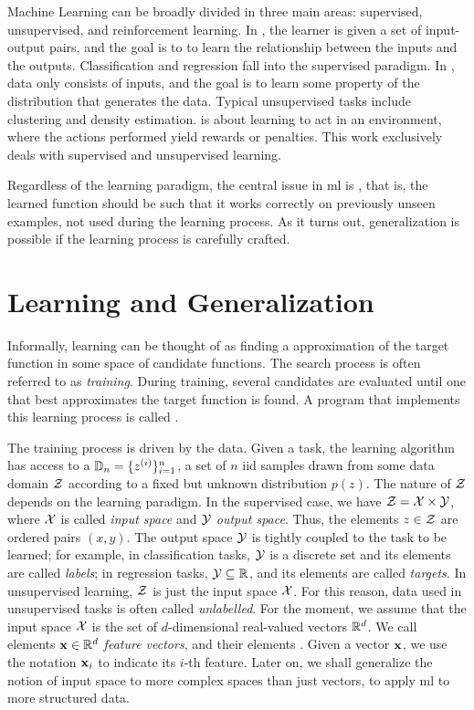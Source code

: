 Machine Learning can be broadly divided in three main areas: supervised, unsupervised, and reinforcement learning. In , the learner is given a set of input-output pairs, and the goal is to to learn the relationship between the inputs and the outputs. Classification and regression fall into the supervised paradigm. In , data only consists of inputs, and the goal is to learn some property of the distribution that generates the data. Typical unsupervised tasks include clustering and density estimation.  \citep{sutton1998rl} is about learning to act in an environment, where the actions performed yield rewards or penalties. This work exclusively deals with supervised and unsupervised learning.

Regardless of the learning paradigm, the central issue in \gls{ml} is , that is, the learned function should be such that it works correctly on previously unseen examples, not used during the learning process. As it turns out, generalization is possible if the learning process is carefully crafted.

\section{Learning and Generalization}\label{sec:learning}
Informally, learning can be thought of as finding a  approximation of the target function in some space of candidate functions. The search process is often referred to as \emph{training}. During training, several candidates are evaluated until one that best approximates the target function is found. A program that implements this learning process is called .

The training process is driven by the data. Given a task, the learning algorithm has access to a  $\mathbb{D}_n = \{ z^{(i)} \}_{i=1}^n$, a set of $n$ \gls{iid} samples drawn from some data domain $\Cal{Z}$ according to a fixed but unknown distribution $p(z)$. The nature of $\Cal{Z}$ depends on the learning paradigm. In the supervised case, we have $\Cal{Z} = \Cal{X} \times \Cal{Y}$, where $\Cal{X}$ is called \emph{input space} and $\Cal{Y}$ \emph{output space}. Thus, the elements $z \in \Cal{z}$ are ordered pairs $(x, y)$. The output space $\Cal{Y}$ is tightly coupled to the task to be learned; for example, in classification tasks, $\Cal{Y}$ is a discrete set and its elements are called \emph{labels}; in regression tasks, $\Cal{Y} \subseteq \Real$, and its elements are called \emph{targets}. In unsupervised learning, $\Cal{Z}$ is just the input space $\Cal{X}$. For this reason, data used in unsupervised tasks is often called \emph{unlabelled}. For the moment, we assume that the input space $\Cal{X}$ is the set of $d$-dimensional real-valued vectors $\mathbb{R}^d$. We call elements $\Vector{x} \in \Real^d$  \emph{feature vectors}, and their elements . Given a vector $\Vector{x}$, we use the notation $\Vector{x}_i$ to indicate its $i$-th feature. Later on, we shall generalize the notion of input space to more complex spaces than just vectors, to apply \gls{ml} to more structured data.

